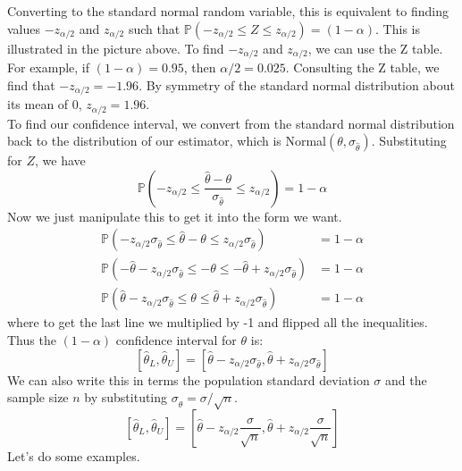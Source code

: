 \documentclass[12pt]{article}
\theoremstyle{definition}
\theoremstyle{remark}
\def\P{{\mathbb P}}
\begin{document}
Converting to the standard normal random variable, this is equivalent to finding values $-z_{\alpha/2}$ and $z_{\alpha/2}$ such that $\P(-z_{\alpha/2} \leq Z \leq z_{\alpha/2}) = (1 - \alpha)$. This is illustrated in the picture above. To find $-z_{\alpha/2}$ and $z_{\alpha/2}$, we can use the Z table. For example, if $(1 - \alpha) = 0.95$, then $\alpha/2 = 0.025$. Consulting the Z table, we find that $-z_{\alpha/2} = -1.96$. By symmetry of the standard normal distribution about its mean of 0, $z_{\alpha/2} = 1.96$.\\

To find our confidence interval, we convert from the standard normal distribution back to the distribution of our estimator, which is Normal$(\theta, \sigma_{\hat{\theta}})$. Substituting for $Z$, we have
\[
\P\left( -z_{\alpha/2} \leq \frac{\hat{\theta} - \theta}{\sigma_{\hat{\theta}}} \leq z_{\alpha/2} \right) = 1 - \alpha
\]
Now we just manipulate this to get it into the form we want.
\begin{align*}
\P\left( -z_{\alpha/2} \sigma_{\hat{\theta}} \leq \hat{\theta} - \theta \leq z_{\alpha/2} \sigma_{\hat{\theta}} \right) &= 1 - \alpha\\
\P\left( - \hat{\theta} -z_{\alpha/2} \sigma_{\hat{\theta}} \leq - \theta \leq -\hat{\theta} + z_{\alpha/2} \sigma_{\hat{\theta}} \right) &= 1 - \alpha\\
\P\left( \hat{\theta} - z_{\alpha/2} \sigma_{\hat{\theta}} \leq \theta \leq \hat{\theta} + z_{\alpha/2} \sigma_{\hat{\theta}} \right) &= 1 - \alpha
\end{align*}
where to get the last line we multiplied by -1 and flipped all the inequalities. Thus the $(1-\alpha)$ confidence interval for $\theta$ is:
\[
[\hat{\theta}_L, \hat{\theta}_U] = [ \hat{\theta} - z_{\alpha/2} \sigma_{\hat{\theta}}, \hat{\theta} + z_{\alpha/2} \sigma_{\hat{\theta}}]
\]
We can also write this in terms the population standard deviation $\sigma$ and the sample size $n$ by substituting $\sigma_{\hat{\theta}} = \sigma/\sqrt{n}$.
\[
[\hat{\theta}_L, \hat{\theta}_U] = \left[ \hat{\theta} - z_{\alpha/2} \frac{\sigma}{\sqrt{n}}, \hat{\theta} + z_{\alpha/2} \frac{\sigma}{\sqrt{n}}\right]
\]
Let's do some examples.
\end{document}
